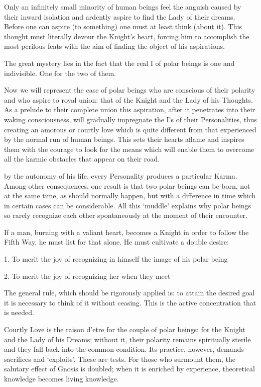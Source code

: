 \begin{quotationx}
Only an infinitely small minority of human beings feel the anguish caused by their inward isolation and ardently aspire to find the Lady of their dreams. Before one can aspire (to something) one must at least think (about it). This thought must literally devour the Knight's heart, forcing him to accomplish the most perilous feats with the aim of finding the object of his aspirations.

The great mystery lies in the fact that the real I of polar beings is one and indivisible. One for the two of them.

Now we will represent the case of polar beings who are conscious of their polarity and who aspire to royal union: that of the Knight and the Lady of his Thoughts. As a prelude to their complete union this aspiration, after it penetrates into their waking consciousness, will gradually impregnate the I's of their Personalities, thus creating an amorous or courtly love which is quite different from that experienced by the normal run of human beings. This sets their hearts aflame and inspires them with the courage to look for the means which will enable them to overcome all the karmic obstacles that appear on their road.

by the autonomy of his life, every Personality produces a particular Karma. Among other consequences, one result is that two polar beings can be born, not at the same time, as should normally happen, but with a difference in time which in certain cases can be considerable. All this `muddle' explains why polar beings so rarely recognize each other spontaneously at the moment of their encounter.

If a man, burning with a valiant heart, becomes a Knight in order to follow the Fifth Way, he must list for that alone. He must cultivate a double desire:

1. To merit the joy of recognizing in himself the image of his polar being 

2. To merit the joy of recognizing her when they meet 

The general rule, which should be rigorously applied is: to attain the desired goal it is necessary to think of it without ceasing. This is the active concentration that is needed.

Courtly Love is the raison d'etre for the couple of polar beings: for the Knight and the Lady of his Dreams; without it, their polarity remains spiritually sterile and they fall back into the common condition. Its practice, however, demands sacrifices and `exploits'. These are tests. For those who surmount them, the salutary effect of Gnosis is doubled; when it is enriched by experience, theoretical knowledge becomes living knowledge.


\end{quotationx}
